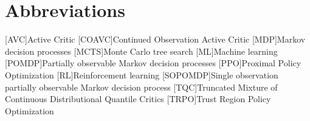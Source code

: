 
\chapter{Abbreviations}
\begin{acronym}
    [AVC]{Active Critic}
    [COAVC]{Continued Observation Active Critic}
    [MDP]{Markov decision processes}
    [MCTS]{Monte Carlo tree search}
    [ML]{Machine learning}
    [POMDP]{Partially observable Markov decision processes}
    [PPO]{Proximal Policy Optimization}
    [RL]{Reinforcement learning}
    [SOPOMDP]{Single observation partially observable Markov decision process}
    [TQC]{Truncated Mixture of Continuous Distributional Quantile Critics}
    [TRPO]{Trust Region Policy Optimization}
\end{acronym}
